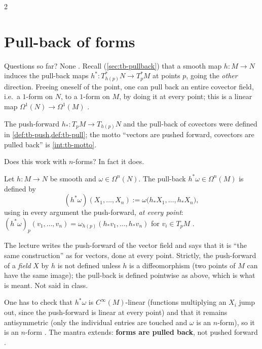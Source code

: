 \begin{paracol}{2}
\section{Pull-back of forms}\label{sec:gr-pullback}

Questions so far? None . Recall (\cref{sec:tb-pullback}) that a smooth map $h\colon M\to N$ induces the pull-back maps $h^*\colon T^*_{h(p)}N\to T^*_pM$ at points $p$, going the \emph{other} direction. Freeing oneself of the point, one can pull back an entire covector field, i.e.\ a $1$-form on $N$, to a $1$-form on $M$, by doing it at every point; this is a linear map
$\Omega^1(N)\to\Omega^1(M)$       .
\begin{recall}
The push-forward $h_*\colon T_pM\to T_{h(p)}N$ and the pull-back of covectors were defined in \cref{def:tb-push,def:tb-pull}; the motto ``vectors are pushed forward, covectors are pulled back'' is \cref{int:tb-motto}.
\end{recall}
Does this work with $n$-forms? In fact it does.
\begin{definition}\label{def:gr-pullback}
Let $h\colon M\to N$ be smooth and $\omega\in\Omega^n(N)$. The pull-back $h^*\omega\in\Omega^n(M)$ is defined by
\[
  (h^*\omega)(X_1,\dots,X_n):=\omega\bigl(h_*X_1,\dots,h_*X_n\bigr),
\]
using in every argument the push-forward, \emph{at every point}: $(h^*\omega)_p(v_1,\dots,v_n)=\omega_{h(p)}(h_*v_1,\dots,h_*v_n)$ for $v_i\in T_pM$       .
\end{definition}
\begin{coursenote}
The lecture writes the push-forward of the vector field and says that it is ``the same construction'' as for vectors, done at every point. Strictly, the push-forward of a \emph{field} $X$ by $h$ is not defined unless $h$ is a diffeomorphism (two points of $M$ can have the same image); the pull-back is defined pointwise as above, which is what is meant. Not said in class.
\end{coursenote}
One has to check that $h^*\omega$ is $C^\infty(M)$-linear (functions multiplying an $X_i$ jump out, since the push-forward is linear at every point) and that it remains antisymmetric (only the individual entries are touched and $\omega$ is an $n$-form), so it is an $n$-form   .
The mantra extends: \textbf{forms are pulled back}, not pushed forward   .


\end{paracol}
